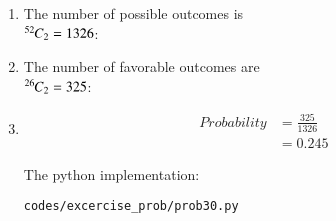 \renewcommand{\theequation}{\theenumi}
\begin{enumerate}

\item The number of possible outcomes is \\ ${{}^{52}\mkern-1muC_{2}} = 1326$:


\item The number of favorable outcomes are \\ ${{}^{26}\mkern-1muC_{2}} = 325$:
 
\item 
\begin{align}
Probability &= \frac{325}{1326}\\
&= 0.245\label{eq:ans_ex_30}
\end{align} 

The python implementation:
\begin{lstlisting}
codes/excercise_prob/prob30.py
\end{lstlisting}

\end{enumerate}